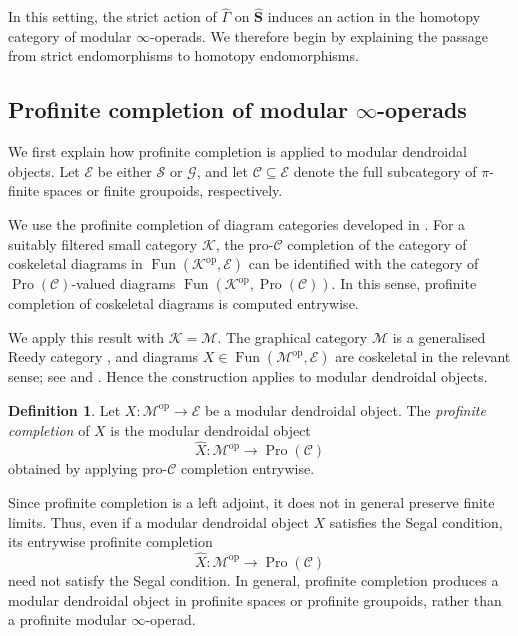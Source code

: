 \documentclass{amsart}
\newcommand{\bE}{\mathscr{E}}
\newcommand{\bM}{\mathscr{M}}
\newcommand{\bS}{\mathbf{S}}
\newcommand{\sSet}{\mathscr{S}}
\newcommand{\Grpd}{\mathscr{G}}
\newcommand{\op}{\mathrm{op}}
\newcommand{\Pro}{\operatorname{Pro}}
\newcommand{\NS}{\widehat{\mathsf{\Gamma}}}
\theoremstyle{definition}
\newtheorem{definition}[theorem]{Definition}%
\numberwithin{equation}{section}
\begin{document}
In this setting, the strict action of ${\NS}$ on $\widehat{\bS}$ induces an action in the homotopy category of modular $\infty$-operads. We therefore begin by explaining the passage from strict endomorphisms to homotopy endomorphisms.


\subsection{Profinite completion of modular $\infty$-operads}\label{sec: profinite modular infty operads}
We first explain how profinite completion is applied to modular dendroidal objects. Let $\bE$ be either $\sSet$ or $\Grpd$, and let $\mathscr C\subseteq \bE$ denote the full subcategory of $\pi$-finite spaces or finite groupoids, respectively.

We use the profinite completion of diagram categories developed in \cite[Theorem~2.4]{BM20}. For a suitably filtered small category $\mathscr K$, the pro-$\mathscr C$ completion of the category of coskeletal diagrams in $\operatorname{Fun}(\mathscr K^{\mathrm{op}},\bE)$ can be identified with the category of $\Pro(\mathscr C)$-valued diagrams $\operatorname{Fun}(\mathscr K^{\mathrm{op}},\Pro(\mathscr C))$. In this sense, profinite completion of coskeletal diagrams is computed entrywise.

We apply this result with $\mathscr K=\bM$. The graphical category $\bM$ is a generalised Reedy category \cite[Theorem~4.10 and Remark~4.17]{hry1}, and diagrams $X\in\operatorname{Fun}(\bM^{\mathrm{op}},\bE)$ are coskeletal in the relevant sense; see \cite{riehl2017inductive} and \cite[Section~6]{bm_reedy}. Hence the construction applies to modular dendroidal objects.

\begin{definition}\label{def: profinite modular operad}
Let $X:\bM^{\mathrm{op}}\to\bE$ be a modular dendroidal object. The \emph{profinite completion} of $X$ is the modular dendroidal object
\[
\widehat X:\bM^{\mathrm{op}}\longrightarrow \Pro(\mathscr C)
\]
obtained by applying pro-$\mathscr C$ completion entrywise.
\end{definition}

Since profinite completion is a left adjoint, it does not in general preserve finite limits. Thus, even if a modular dendroidal object $X$ satisfies the Segal condition, its entrywise profinite completion
\[
\widehat X:\bM^{\op}\longrightarrow \Pro(\mathscr C)
\]
need not satisfy the Segal condition. In general, profinite completion produces a modular dendroidal object in profinite spaces or profinite groupoids, rather
than a profinite modular $\infty$-operad.
\end{document}
